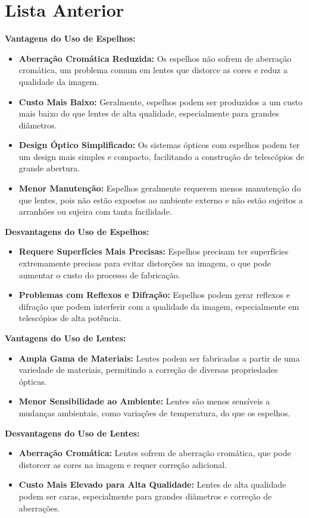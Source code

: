 \documentclass[a4paper, 12pt]{article}
\begin{document}
\section*{Lista Anterior}
\textbf{Vantagens do Uso de Espelhos:}
\begin{itemize}
    \item \textbf{Aberração Cromática Reduzida:} Os espelhos não sofrem de aberração cromática, um problema comum em lentes que distorce as cores e reduz a qualidade da imagem.
    \item \textbf{Custo Mais Baixo:} Geralmente, espelhos podem ser produzidos a um custo mais baixo do que lentes de alta qualidade, especialmente para grandes diâmetros.
    \item \textbf{Design Óptico Simplificado:} Os sistemas ópticos com espelhos podem ter um design mais simples e compacto, facilitando a construção de telescópios de grande abertura.
    \item \textbf{Menor Manutenção:} Espelhos geralmente requerem menos manutenção do que lentes, pois não estão expostos ao ambiente externo e não estão sujeitos a arranhões ou sujeira com tanta facilidade.
\end{itemize}

\textbf{Desvantagens do Uso de Espelhos:}
\begin{itemize}
    \item \textbf{Requere Superfícies Mais Precisas:} Espelhos precisam ter superfícies extremamente precisas para evitar distorções na imagem, o que pode aumentar o custo do processo de fabricação.
    \item \textbf{Problemas com Reflexos e Difração:} Espelhos podem gerar reflexos e difração que podem interferir com a qualidade da imagem, especialmente em telescópios de alta potência.
\end{itemize}

\textbf{Vantagens do Uso de Lentes:}
\begin{itemize}
    \item \textbf{Ampla Gama de Materiais:} Lentes podem ser fabricadas a partir de uma variedade de materiais, permitindo a correção de diversas propriedades ópticas.
    \item \textbf{Menor Sensibilidade ao Ambiente:} Lentes são menos sensíveis a mudanças ambientais, como variações de temperatura, do que os espelhos.
\end{itemize}

\textbf{Desvantagens do Uso de Lentes:}
\begin{itemize}
    \item \textbf{Aberração Cromática:} Lentes sofrem de aberração cromática, que pode distorcer as cores na imagem e requer correção adicional.
    \item \textbf{Custo Mais Elevado para Alta Qualidade:} Lentes de alta qualidade podem ser caras, especialmente para grandes diâmetros e correção de aberrações.
\end{itemize}
\end{document}

